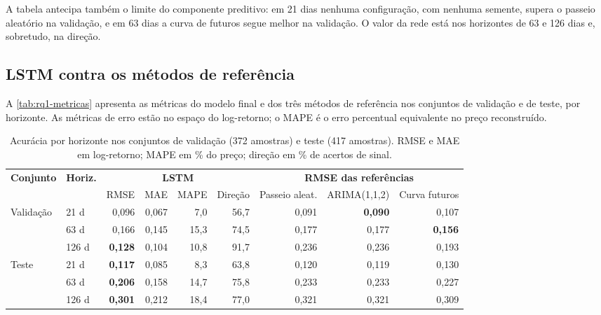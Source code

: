 A tabela antecipa também o limite do componente preditivo: em 21 dias nenhuma configuração, com nenhuma semente, supera o passeio aleatório na validação, e em 63 dias a curva de futuros segue melhor na validação. O valor da rede está nos horizontes de 63 e 126 dias e, sobretudo, na direção.

\subsection{LSTM contra os métodos de referência}

A \autoref{tab:rq1-metricas} apresenta as métricas do modelo final e dos três métodos de referência nos conjuntos de validação e de teste, por horizonte. As métricas de erro estão no espaço do log-retorno; o MAPE é o erro percentual equivalente no preço reconstruído.

\begin{table}[htb]
	\centering
	\caption{Acurácia por horizonte nos conjuntos de validação (372 amostras) e teste (417 amostras). RMSE e MAE em log-retorno; MAPE em \% do preço; direção em \% de acertos de sinal.}\label{tab:rq1-metricas}
	\footnotesize
	\setlength{\tabcolsep}{3.5pt}
	\begin{tabular}{l l r r r r r r r}
		\hline
		\textbf{Conjunto} & \textbf{Horiz.} & \multicolumn{4}{c}{\textbf{LSTM}} & \multicolumn{3}{c}{\textbf{RMSE das referências}} \\
		& & RMSE & MAE & MAPE & Direção & Passeio aleat. & ARIMA(1,1,2) & Curva futuros \\ \hline
		Validação & 21 d  & 0,096 & 0,067 & 7,0  & 56,7 & 0,091 & \textbf{0,090} & 0,107 \\
		          & 63 d  & 0,166 & 0,145 & 15,3 & 74,5 & 0,177 & 0,177 & \textbf{0,156} \\
		          & 126 d & \textbf{0,128} & 0,104 & 10,8 & 91,7 & 0,236 & 0,236 & 0,193 \\ \hline
		Teste     & 21 d  & \textbf{0,117} & 0,085 & 8,3  & 63,8 & 0,120 & 0,119 & 0,130 \\
		          & 63 d  & \textbf{0,206} & 0,158 & 14,7 & 75,8 & 0,233 & 0,233 & 0,227 \\
		          & 126 d & \textbf{0,301} & 0,212 & 18,4 & 77,0 & 0,321 & 0,321 & 0,309 \\ \hline
	\end{tabular}
\end{table}

